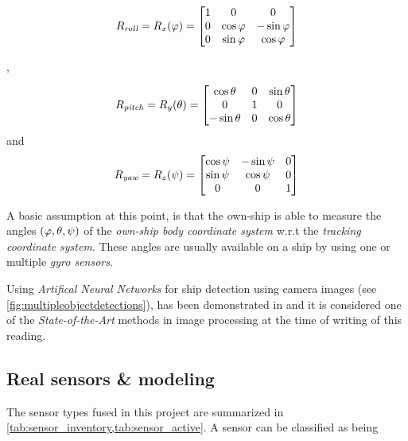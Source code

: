 \begin{description}
\begin{equation}
R_{\textit{roll}}= R_x({\varphi}) =
\begin{bmatrix}
1 &0 &0\\
0 &\cos{\varphi} &-\sin {\varphi}\\
0 &\sin {\varphi} &\cos {\varphi}
\end{bmatrix}
\end{equation}


,


\begin{equation}
R_{\textit{pitch}}= R_y({\theta}) =
\begin{bmatrix}
\cos{\theta} &0 &\sin {\theta}\\
0 &1 &0\\
-\sin {\theta} &0 &\cos{\theta}
\end{bmatrix}
\end{equation}
and
\begin{equation}\label{eq:rot_yaw}
R_{\textit{yaw}}= R_{z}({\psi}) =   \left[\begin{matrix}\cos{\psi} &-\sin{\psi}&0\\\sin{\psi} &\cos {\psi}&0\\0&0&1\end{matrix}\right]
\end{equation}

A basic assumption at this point, is that the own-ship is able to measure the angles $({\varphi},{\theta},{\psi})$ of the \emph{own-ship body coordinate system} w.r.t the \emph{tracking coordinate system}. These angles are usually available on a ship by using one or multiple \emph{gyro sensors}.

\end{description}

 Using \emph{Artifical Neural Networks} for ship detection using camera images (see \cref{fig:multipleobjectdetections}), has been demonstrated in \cite{Blanke2020} and it is considered one of the \emph{State-of-the-Art} methods in image processing at the time of writing of this reading.

\subsection{Real sensors \& modeling}

The sensor types fused in this project are summarized in \cref{tab:sensor_inventory,tab:sensor_active}. A sensor can be classified as being

